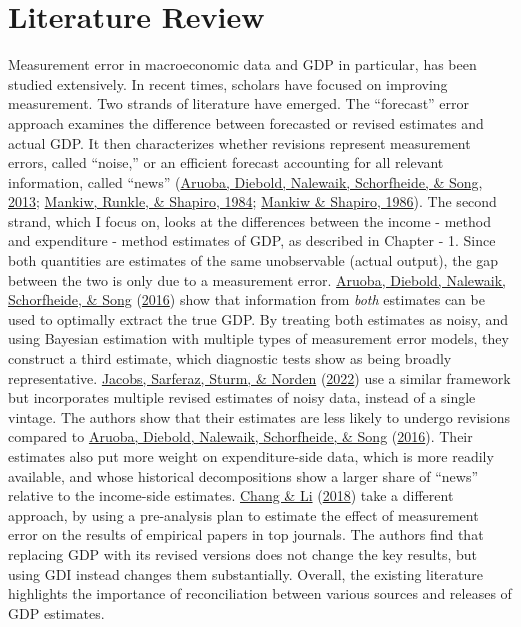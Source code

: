 \documentclass[12pt,nobind, a4paper]{reedthesis}
\begin{document}
 \hypertarget{lit}{%
 \section{Literature Review}\label{lit}}

 Measurement error in macroeconomic data and GDP in particular, has been studied extensively. In recent times, scholars have focused on improving measurement. Two strands of literature have emerged. The ``forecast'' error approach examines the difference between forecasted or revised estimates and actual GDP. It then characterizes whether revisions represent measurement errors, called ``noise,'' or an efficient forecast accounting for all relevant information, called ``news'' (\protect\hyperlink{ref-aruoba_improving_2013}{Aruoba, Diebold, Nalewaik, Schorfheide, \& Song, 2013}; \protect\hyperlink{ref-mankiw_are_1984}{Mankiw, Runkle, \& Shapiro, 1984}; \protect\hyperlink{ref-mankiw_news_1986}{Mankiw \& Shapiro, 1986}). The second strand, which I focus on, looks at the differences between the income - method and expenditure - method estimates of GDP, as described in Chapter - 1. Since both quantities are estimates of the same unobservable (actual output), the gap between the two is only due to a measurement error. \protect\hyperlink{ref-aruoba_improving_2016}{Aruoba, Diebold, Nalewaik, Schorfheide, \& Song} (\protect\hyperlink{ref-aruoba_improving_2016}{2016}) show that information from \emph{both} estimates can be used to optimally extract the true GDP. By treating both estimates as noisy, and using Bayesian estimation with multiple types of measurement error models, they construct a third estimate, which diagnostic tests show as being broadly representative. \protect\hyperlink{ref-jacobs_can_2022}{Jacobs, Sarferaz, Sturm, \& Norden} (\protect\hyperlink{ref-jacobs_can_2022}{2022}) use a similar framework but incorporates multiple revised estimates of noisy data, instead of a single vintage. The authors show that their estimates are less likely to undergo revisions compared to \protect\hyperlink{ref-aruoba_improving_2016}{Aruoba, Diebold, Nalewaik, Schorfheide, \& Song} (\protect\hyperlink{ref-aruoba_improving_2016}{2016}). Their estimates also put more weight on expenditure-side data, which is more readily available, and whose historical decompositions show a larger share of ``news'' relative to the income-side estimates. \protect\hyperlink{ref-chang_measurement_2018}{Chang \& Li} (\protect\hyperlink{ref-chang_measurement_2018}{2018}) take a different approach, by using a pre-analysis plan to estimate the effect of measurement error on the results of empirical papers in top journals. The authors find that replacing GDP with its revised versions does not change the key results, but using GDI instead changes them substantially. Overall, the existing literature highlights the importance of reconciliation between various sources and releases of GDP estimates.
 \linebreak
\end{document}
